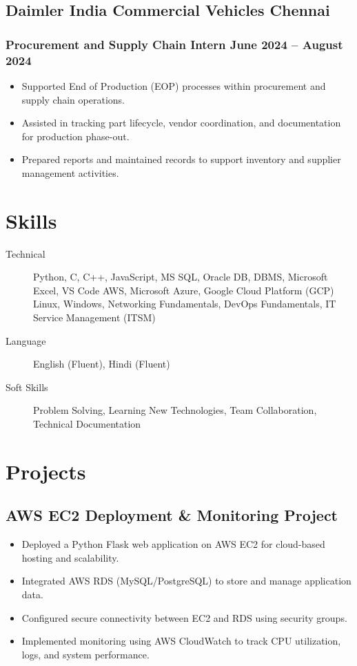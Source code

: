 \documentclass[11pt]{article}
\newcommand{\rside}[1]{
  \hfill {\normalfont\color{accent} #1}%
}
\begin{document}
\subsection{Daimler India Commercial Vehicles \rside{Chennai}}
\subsubsection{Procurement and Supply Chain Intern \rside{June 2024 -- August 2024}}
\begin{itemize}
  \item Supported End of Production (EOP) processes within procurement and supply chain operations.
  \item Assisted in tracking part lifecycle, vendor coordination, and documentation for production phase-out.
  \item Prepared reports and maintained records to support inventory and supplier management activities.
\end{itemize}


\section{Skills}
\begin{description}
  \item[Technical] Python, C, C++, JavaScript, MS SQL, Oracle DB, DBMS, Microsoft Excel, VS Code
AWS, Microsoft Azure, Google Cloud Platform (GCP)
Linux, Windows, Networking Fundamentals, DevOps Fundamentals, IT Service Management (ITSM)
 
  \item[Language] English (Fluent), Hindi (Fluent)
  \item[Soft Skills] Problem Solving, Learning New Technologies, Team Collaboration, Technical Documentation
\end{description}


\section{Projects}
\subsection{AWS EC2 Deployment & Monitoring Project}
\begin{itemize}
  \item Deployed a Python Flask web application on AWS EC2 for cloud-based hosting and scalability.
  \item Integrated AWS RDS (MySQL/PostgreSQL) to store and manage application data.%
  \item Configured secure connectivity between EC2 and RDS using security groups.
  \item Implemented monitoring using AWS CloudWatch to track CPU utilization, logs, and
system performance.
\end{itemize}
\end{document}
